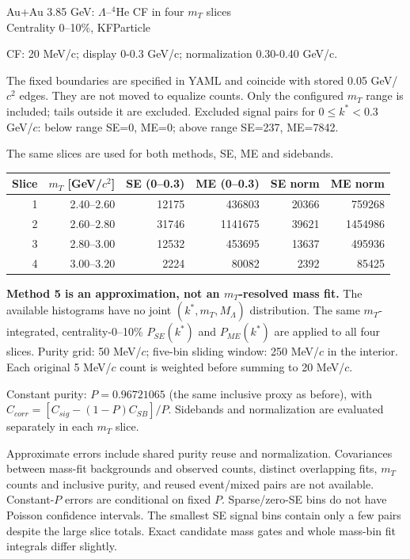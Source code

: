 \documentclass[10pt,a4paper]{article}
\begin{document}
\begin{center}\Large Au+Au 3.85 GeV: $\Lambda$--$^4$He CF in four $m_T$ slices\\
\large Centrality 0--10\%, KFParticle\end{center}
\noindent CF: 20 MeV/c; display 0-0.3 GeV/c; normalization 0.30-0.40 GeV/c.

\medskip
\noindent The fixed boundaries are specified in YAML and coincide with stored
0.05 GeV/$c^2$ edges. They are not moved to equalize counts.
Only the configured $m_T$ range is included; tails outside it are excluded.
Excluded signal pairs for $0\leq k^*<0.3$ GeV/$c$: below range SE=0, ME=0; above range SE=237, ME=7842.

The same slices are used for both methods, SE, ME and sidebands.

\begin{center}\small\begin{tabular}{rrrrrr}\toprule
Slice & $m_T$ [GeV/$c^2$] & SE (0--0.3) & ME (0--0.3) & SE norm & ME norm\\\midrule
1 & 2.40–2.60 & 12175 & 436803 & 20366 & 759268 \\
2 & 2.60–2.80 & 31746 & 1141675 & 39621 & 1454986 \\
3 & 2.80–3.00 & 12532 & 453695 & 13637 & 495936 \\
4 & 3.00–3.20 & 2224 & 80082 & 2392 & 85425 \\
\bottomrule\end{tabular}\end{center}

\noindent\textbf{Method 5 is an approximation, not an $m_T$-resolved mass fit.}
The available histograms have no joint $(k^*,m_T,M_\Lambda)$ distribution.
The same $m_T$-integrated, centrality-0--10\% $P_{SE}(k^*)$ and $P_{ME}(k^*)$
are applied to all four slices. Purity grid: 50 MeV/$c$;
five-bin sliding window: 250 MeV/$c$ in the interior.
Each original 5 MeV/$c$ count is weighted before summing to 20 MeV/$c$.

\medskip
\noindent Constant purity: $P=0.96721065$ (the same inclusive proxy as before),
with $C_{corr}=[C_{sig}-(1-P)C_{SB}]/P$. Sidebands and normalization
are evaluated separately in each $m_T$ slice.

\medskip
\noindent Approximate errors include shared purity reuse and normalization.
Covariances between mass-fit backgrounds and observed counts, distinct overlapping
fits, $m_T$ counts and inclusive purity, and reused event/mixed pairs are not available.
Constant-$P$ errors are conditional on fixed $P$.
Sparse/zero-SE bins do not have Poisson confidence intervals.
The smallest SE signal bins contain only a few pairs despite the large slice totals.
Exact candidate mass gates and whole mass-bin fit integrals differ slightly.
\end{document}
